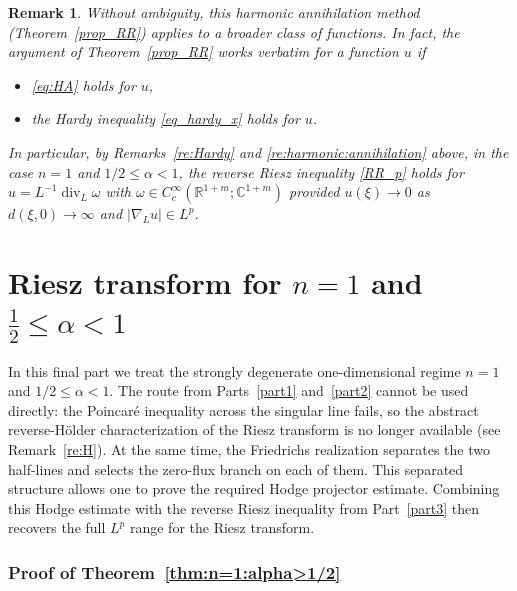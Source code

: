 \documentclass[12pt]{amsart}
\newtheorem{remark}[theorem]{Remark}
\begin{document}
\begin{remark}\label{re:applicable:HA}
Without ambiguity, this harmonic annihilation method (Theorem~\ref{prop_RR}) applies to a broader class of functions. In fact, the argument of Theorem~\ref{prop_RR} works verbatim for a function $u$ if
\begin{itemize}
    \item \eqref{eq:HA} holds for $u$,
    \item the Hardy inequality \eqref{eq_hardy_x} holds for $u$.
\end{itemize}
In particular, by Remarks~\ref{re:Hardy} and \ref{re:harmonic:annihilation} above, in the case $n=1$ and $1/2\le \alpha<1$, the reverse Riesz inequality \eqref{RR_p} holds for $u=L^{-1} \operatorname{div}_L \omega$ with $\omega \in C_c^\infty(\mathbb{R}^{1+m}; \mathbb{C}^{1+m})$ provided $u(\xi) \to 0$ as $d(\xi,0)\to \infty$ and $|\nabla_L u|\in L^p$.
\end{remark}










\part{Riesz transform for \texorpdfstring{$n=1$}{n=1} and \texorpdfstring{$\frac{1}{2}\le \alpha<1$}{1/2<alpha<1}}\label{part4}



In this final part we treat the strongly degenerate one-dimensional regime $n=1$ and $1/2\le \alpha<1$. The route from Parts~\ref{part1} and~\ref{part2} cannot be used
directly: the Poincar\'e inequality across the singular line fails, so the abstract reverse-H\"older characterization of the Riesz transform is no longer available (see Remark~\ref{re:H}). At the same time, the Friedrichs realization separates the two half-lines and selects the zero-flux branch on each of them. This separated structure allows one
to prove the required Hodge projector estimate. Combining this Hodge estimate with the reverse Riesz inequality from Part~\ref{part3} then recovers the full $L^p$ range
for the Riesz transform.



\section{Proof of Theorem~\ref{thm:n=1:alpha>1/2}}
\end{document}
